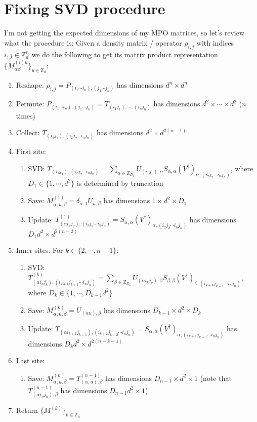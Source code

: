 \documentclass{report}
\begin{document}
\section{Fixing SVD procedure}

I'm not getting the expected dimensions of my MPO matrices, so let's review what the procedure is: Given a density matrix / operator $\rho_{i,j}$ with indices $i,j\in \mathbb Z_d^n$ we do the following to get its matrix product representation $\{M^{(i)u}_{\alpha\beta}\}_{u\in \mathbb Z_d}$:

\begin{enumerate}
\item Reshape: $\rho_{i,j}= P_{(i_1\cdots i_n),(j_1\cdots j_n)}$ has dimensions $d^n\times d^n$
\item Permute: $P_{(i_1\cdots i_n),(j_1\cdots j_n)}= T_{(i_1j_1),\cdots ,(i_nj_n)}$ has dimensions $d^2\times\cdots \times d^2$ ($n$ times)
\item Collect: $T_{(i_1j_1),(i_2j_2\cdots i_nj_n)}$ has dimensions $d^2\times d^{2(n-1)}$
\item First site:
	\begin{enumerate}
	\item SVD: $T_{(i_1j_1),(i_2j_2\cdots i_nj_n)}=\sum_{\alpha\in \mathbb Z_{D_1}} U_{(i_1j_1),\alpha}S_{\alpha,\alpha} (V^\dagger)_{\alpha,(i_2j_2\cdots i_nj_n)}$, where $D_1\in \{1,\cdots,d^2\}$ is determined by truncation 
	\item Save: $M^{(1)}_{\alpha,u,\beta}=\delta_{\alpha,1}U_{u,\beta}$ has dimensions $1\times d^2\times D_1$
	\item Update: $T^{(1)}_{(\alpha i_2j_2),(i_3j_3\cdots i_nj_n)}=S_{\alpha,\alpha}(V^\dagger)_{\alpha,(i_2j_2\cdots i_nj_n)}$ has dimensions $D_1 d^2\times d^{2(n-2)}$
	\end{enumerate}
\item Inner sites: For $k\in \{2,\cdots,n-1\}$:
	\begin{enumerate}
	\item SVD: $T^{(k)}_{(\alpha i_kj_k),(i_{k+1}j_{k+1}\cdots i_nj_n)}=\sum_{\beta\in \mathbb Z_{D_k}} U_{(\alpha i_kj_k),\beta}S_{\beta,\beta} (V^\dagger)_{\beta,(i_{k+1}j_{k+1}\cdots i_nj_n)}$, where $D_k\in\{1,\cdots,D_{k-1}d^2\}$
	\item Save: $M^{(k)}_{\alpha,u,\beta}=U_{(\alpha u),\beta}$ has dimensions $D_{k-1}\times d^2\times D_k$
	\item Update: $T_{(\alpha i_{k+1}j_{k+1}),(i_{k+2}j_{k+2}\cdots i_nj_n)}=S_{\alpha,\alpha} (V^\dagger)_{\alpha,(i_{k+1}j_{k+1}\cdots i_nj_n)}$ has dimensions $D_k d^2\times d^{2(n-k-1)}$
	\end{enumerate}
\item Last site:
	\begin{enumerate}
	\item Save: $M^{(n)}_{\alpha,u,\beta}=T^{(n-1)}_{(\alpha,u),\beta}$ has dimensions $D_{n-1}\times d^2\times 1$ (note that $T^{(n-1)}_{(\alpha i_nj_n),\beta}$ has dimensions $D_{n-1} d^2\times 1$)
	\end{enumerate}
\item Return $\{M^{(k)}\}_{k\in\mathbb Z_n}$
\end{enumerate}
\end{document}
